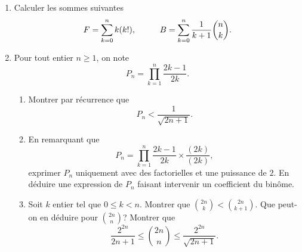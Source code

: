 \begin{enumerate}
\item Calculer les sommes suivantes 
    \begin{displaymath}
  F =\sum_{k=0}^{n}k(k!), \hspace*{1cm} B = \sum_{k=0}^{n}\frac{1}{k+1}\binom{n}{k}.
    \end{displaymath}
    
\item Pour tout entier $n\geq 1$, on note
\begin{displaymath}
  P_n = \prod_{k=1}^n\frac{2k-1}{2k}.
\end{displaymath}
\begin{enumerate}
  \item Montrer par récurrence que 
  \begin{displaymath}
    P_n < \frac{1}{\sqrt{2n+1}}.
  \end{displaymath}
  \item En remarquant que
\begin{displaymath}
  P_n = \prod_{k=1}^n\frac{2k-1}{2k}\times \frac{(2k)}{(2k)},
\end{displaymath}
exprimer $P_n$ uniquement avec des factorielles et une puissance de $2$. En déduire une expression de $P_n$ faisant intervenir un coefficient du binôme.
  \item Soit $k$ entier tel que $0\leq k < n$. Montrer que $\binom{2n}{k} < \binom{2n}{k+1}$. Que peut-on en déduire pour $\binom{2n}{n}$? Montrer que
\begin{displaymath}
  \frac{2^{2n}}{2n + 1} \leq \binom{2n}{n} \leq \frac{2^{2n}}{\sqrt{2n+1}}.
\end{displaymath}

\end{enumerate}
\end{enumerate}
